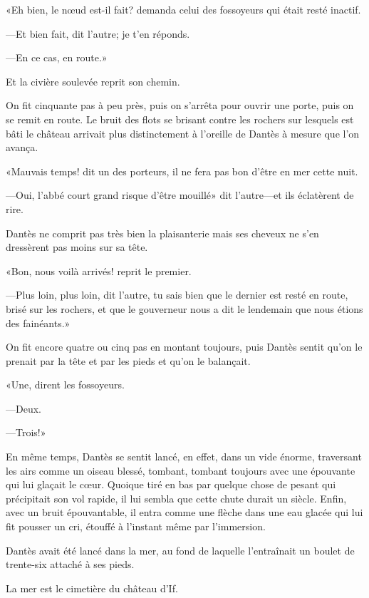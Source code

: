 «Eh bien, le nœud est-il fait? demanda celui des fossoyeurs qui était resté inactif.

—Et bien fait, dit l'autre; je t'en réponds.

—En ce cas, en route.»

Et la civière soulevée reprit son chemin.

On fit cinquante pas à peu près, puis on s'arrêta pour ouvrir une porte, puis on se remit en route. Le bruit des flots se brisant contre les rochers sur lesquels est bâti le château arrivait plus distinctement à l'oreille de Dantès à mesure que l'on avança.

«Mauvais temps! dit un des porteurs, il ne fera pas bon d'être en mer cette nuit.

—Oui, l'abbé court grand risque d'être mouillé» dit l'autre—et ils éclatèrent de rire.

Dantès ne comprit pas très bien la plaisanterie mais ses cheveux ne s'en dressèrent pas moins sur sa tête.

«Bon, nous voilà arrivés! reprit le premier.

—Plus loin, plus loin, dit l'autre, tu sais bien que le dernier est resté en route, brisé sur les rochers, et que le gouverneur nous a dit le lendemain que nous étions des fainéants.»

On fit encore quatre ou cinq pas en montant toujours, puis Dantès sentit qu'on le prenait par la tête et par les pieds et qu'on le balançait.

«Une, dirent les fossoyeurs.

—Deux.

—Trois!»

En même temps, Dantès se sentit lancé, en effet, dans un vide énorme, traversant les airs comme un oiseau blessé, tombant, tombant toujours avec une épouvante qui lui glaçait le cœur. Quoique tiré en bas par quelque chose de pesant qui précipitait son vol rapide, il lui sembla que cette chute durait un siècle. Enfin, avec un bruit épouvantable, il entra comme une flèche dans une eau glacée qui lui fit pousser un cri, étouffé à l'instant même par l'immersion.

Dantès avait été lancé dans la mer, au fond de laquelle l'entraînait un boulet de trente-six attaché à ses pieds.

La mer est le cimetière du château d'If.




